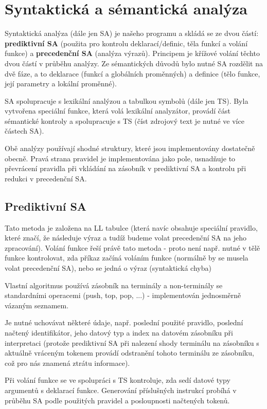 \section {Syntaktická a sémantická analýza}

Syntaktická analýza (dále jen SA) je  našeho programu a skládá se ze dvou částí: \textbf{prediktivní SA} (použita pro kontrolu deklarací/definic, těla funkcí a volání funkce)
a \textbf{precedenční SA} (analýza výrazů). Principem je křížové volání těchto dvou částí v průběhu analýzy. Ze sémantických důvodů bylo nutné SA rozdělit na dvě fáze, a to deklarace (funkcí a globálních proměnných) a definice (tělo funkce, její parametry a lokální proměnné).

SA spolupracuje s lexikální analýzou a tabulkou symbolů (dále jen TS). Byla vytvořena speciální funkce, která volá lexikální analyzátor, provádí část sémantické kontroly a spolupracuje s TS (číst zdrojový text je nutné ve více částech SA).

Obě analýzy používají shodné struktury, které jsou implementovány dostatečně obecně. Pravá strana pravidel je implementována jako pole, usnadňuje to převrácení pravidla při vkládání na zásobník v prediktivní SA a kontrolu při redukci v precedenční SA.

\subsection{Prediktivní SA}

Tato metoda je založena na LL tabulce (která navíc obsahuje speciální pravidlo, které značí, že následuje výraz a tudíž budeme volat precedenční SA na jeho zpracování).
Volání funkce řeší právě tato metoda - proto není např. nutné v tělě funkce kontrolovat, zda příkaz začíná voláním funkce (normálně by se musela volat precedenční SA), nebo se jedná o výraz (syntaktická chyba)

Vlastní algoritmus používá zásobník na terminály a non-terminály se standardními operacemi (push, top, pop, ...) - implementován jednosměrně vázaným seznamem.

Je nutné uchovávat některé údaje, např. poslední použité pravidlo, poslední načtený identifikátor, jeho datový typ a index na datovém zásobníku při interpretaci (protože prediktivní SA při nalezení shody terminálu na zásobníku s aktuálně vráceným tokenem provádí odstranění tohoto terminálu ze zásobníku, což pro nás znamená ztrátu informace).

Při volání funkce se ve spolupráci s TS kontroluje, zda sedí datové typy argumentů s deklarací funkce. Generování příslušných instrukcí probíhá v průběhu SA podle použitých pravidel a posloupnosti načtených tokenů.

